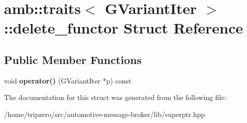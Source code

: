 \hypertarget{structamb_1_1traits_3_01GVariantIter_01_4_1_1delete__functor}{\section{amb\-:\-:traits$<$ G\-Variant\-Iter $>$\-:\-:delete\-\_\-functor Struct Reference}
\label{structamb_1_1traits_3_01GVariantIter_01_4_1_1delete__functor}
}
\subsection*{Public Member Functions}
\begin{DoxyCompactItemize}
\item 
\hypertarget{structamb_1_1traits_3_01GVariantIter_01_4_1_1delete__functor_a28037ddb5e64f1e716abbaa840db1ad5}{void {\bfseries operator()} (G\-Variant\-Iter $\ast$p) const }\label{structamb_1_1traits_3_01GVariantIter_01_4_1_1delete__functor_a28037ddb5e64f1e716abbaa840db1ad5}

\end{DoxyCompactItemize}


The documentation for this struct was generated from the following file\-:\begin{DoxyCompactItemize}
\item 
/home/tripzero/src/automotive-\/message-\/broker/lib/superptr.\-hpp\end{DoxyCompactItemize}
